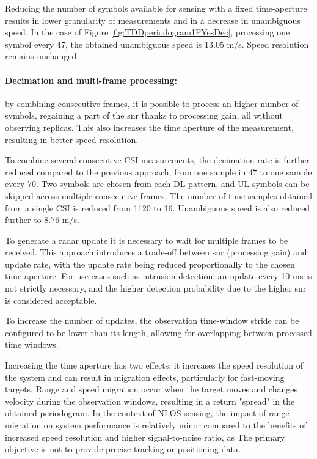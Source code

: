 		     Reducing the number of symbols available for sensing with a fixed time-aperture results in lower granularity of measurements and in a decrease in unambiguous speed. \protect\newline In the case of Figure \ref{fig:TDDperiodogram1FYesDec}, processing one symbol every 47, the obtained unambiguous speed is $13.05$ m/s. \protect\newline Speed resolution remains unchanged.
		    
		     \paragraph{Decimation and multi-frame processing:}
		     by combining consecutive frames, it is possible to process an higher number of symbols, regaining a part of the \gls{snr} thanks to processing gain, all without observing replicas. 
		     This also increases the time aperture of the measurement, resulting in better speed resolution.
		     
			 To combine several consecutive CSI measurements, the decimation rate is further reduced compared to the previous approach, from one sample in 47 to one sample every 70. 
			 Two symbols are chosen from each DL pattern, and UL symbols can be skipped across multiple consecutive frames.
			 The number of time samples obtained from a single CSI is reduced from 1120 to 16.
			 Unambiguous speed is also reduced further to $8.76$ m/s.
			 
			 To generate a radar update it is necessary to wait for multiple frames to be received.
			 This approach introduces a trade-off between \gls{snr} (processing gain) and update rate, with the update rate being reduced proportionally to the chosen time aperture.
		     For use cases such as intrusion detection, an update every 10 ms is not strictly necessary, and the higher detection probability due to the higher \gls{snr} is considered acceptable.
		          
		     To increase the number of updates, the observation time-window stride can be configured to be lower than its length, allowing for overlapping between processed time windows.
		      
		     Increasing the time aperture has two effects: it increases the speed resolution of the system and can result in migration effects, particularly for fast-moving targets. 
		     Range and speed migration occur when the target moves and changes velocity during the observation windows, resulting in a return "spread" in the obtained periodogram.
		     In the context of NLOS sensing, the impact of range migration on system performance is relatively minor compared to the benefits of increased speed resolution and higher signal-to-noise ratio, as The primary objective is not to provide precise tracking or positioning data.
			
